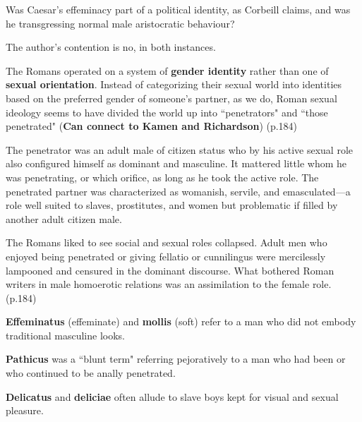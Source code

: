 \begin{qst}
    Was Caesar's effeminacy part of a political identity, as Corbeill claims, and was he transgressing normal male aristocratic behaviour?
\end{qst}

The author's contention is no, in both instances.


\begin{rmk}
    The Romans operated on a system of \textbf{gender identity} rather than one of \textbf{sexual orientation}. Instead of categorizing their sexual world into identities based on the preferred gender of someone's partner, as we do, Roman sexual ideology seems to have divided the world up into ``penetrators" and ``those penetrated" (\textbf{Can connect to Kamen and Richardson}) (p.184)
\end{rmk}

The penetrator was an adult male of citizen status who by his active sexual role also configured himself as dominant and masculine. It mattered little whom he was penetrating, or which orifice, as long as he took the active role. The penetrated partner was characterized as womanish, servile, and emasculated---a role well suited to slaves, prostitutes, and women but problematic if filled by another adult citizen male.

\begin{rmk}
    The Romans liked to see social and sexual roles collapsed. Adult men who enjoyed being penetrated or giving fellatio or cunnilingus were mercilessly lampooned and censured in the dominant discourse. What bothered Roman writers in male homoerotic relations was an assimilation to the female role. (p.184)
\end{rmk}

\begin{defn}
    \textbf{Effeminatus} (effeminate) and \textbf{mollis} (soft) refer to a man who did not embody traditional masculine looks.
\end{defn}

\begin{defn}
    \textbf{Pathicus} was a ``blunt term" referring pejoratively to a man who had been or who continued to be anally penetrated.
\end{defn}

\begin{defn}
    \textbf{Delicatus} and \textbf{deliciae} often allude to slave boys kept for visual and sexual pleasure.
\end{defn}

